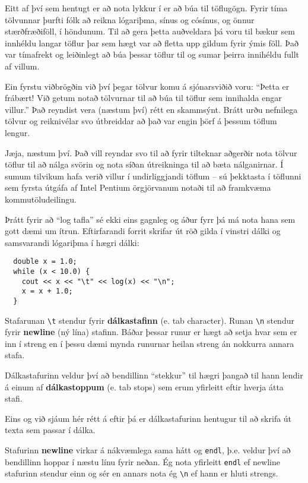 Eitt af því sem hentugt er að nota lykkur í er að búa til töflugögn.
Fyrir tíma tölvunnar þurfti fólk að reikna lógariþma, sínus og cósínus, og önnur stærðfræðiföll, í höndunum.
Til að gera þetta auðveldara þá voru til bækur sem innhéldu langar töflur þar sem hægt var að fletta upp gildum fyrir ýmis föll.
Það var tímafrekt og leiðinlegt að búa þessar töflur til og sumar þeirra innihéldu fullt af villum.

Ein fyrstu viðbrögðin við því þegar tölvur komu á sjónarsviðið voru:
``Þetta er frábært!  Við getum notað tölvurnar til að búa til töflur sem innihalda engar villur.''
Það reyndist vera (næstum því) rétt en skammsýnt.
Brátt urðu nefnilega tölvur og reiknivélar svo útbreiddar að það var engin þörf á þessum töflum lengur.

Jæja, næstum því.
Það vill reyndar svo til að fyrir tilteknar aðgerðir nota tölvur töflur til að nálga svörin og nota síðan útreikninga til að bæta nálganirnar.
Í sumum tilvikum hafa verið villur í undirliggjandi töflum -- sú þekktasta í töflunni sem fyrsta útgáfa af Intel Pentium örgjörvanum notaði til að framkvæma kommutöludeilingu.


Þrátt fyrir að ``log tafla'' sé ekki eins gagnleg og áður fyrr þá má nota hana sem gott dæmi um ítrun.
Eftirfarandi forrit skrifar út röð gilda í vinstri dálki og samsvarandi lógariþma í hægri dálki:

\begin{verbatim}
  double x = 1.0;
  while (x < 10.0) {
    cout << x << "\t" << log(x) << "\n";
    x = x + 1.0;
  }
\end{verbatim}
%
Stafarunan \verb+\t+ stendur fyrir {\bf dálkastafinn} (e. tab character).
Runan \verb+\n+ stendur fyrir {\bf newline} (ný lína) stafinn.
Báðar þessar runur er hægt að setja hvar sem er inn í streng en í þessu dæmi mynda runurnar heilan streng án nokkurra annara stafa.

Dálkastafurinn veldur því að bendillinn ``stekkur'' til hægri þangað til hann lendir á einum af {\bf dálkastoppum} (e. tab stops) sem erum yfirleitt eftir hverja átta stafi.

Eins og við sjáum hér rétt á eftir þá er dálkastafurinn hentugur til að skrifa út texta sem passar í dálka.

Stafurinn {\bf newline} virkar á nákvæmlega sama hátt og {\tt endl}, þ.e. veldur því að bendillinn hoppar í næstu línu fyrir neðan.
Ég nota yfirleitt {\tt endl} ef newline stafurinn stendur einn og sér en annars nota ég \verb+\n+ ef hann er hluti strengs.


